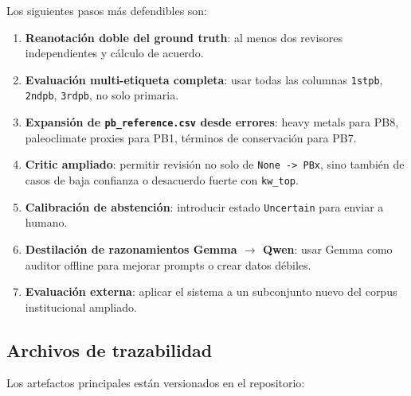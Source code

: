 Los siguientes pasos más defendibles son:

\begin{enumerate}
\item \textbf{Reanotación doble del ground truth}: al menos dos revisores independientes y cálculo de acuerdo.
\item \textbf{Evaluación multi-etiqueta completa}: usar todas las columnas \texttt{1stpb}, \texttt{2ndpb}, \texttt{3rdpb}, no solo primaria.
\item \textbf{Expansión de \texttt{pb\_reference.csv} desde errores}: heavy metals para PB8, paleoclimate proxies para PB1, términos de conservación para PB7.
\item \textbf{Critic ampliado}: permitir revisión no solo de \texttt{None -> PBx}, sino también de casos de baja confianza o desacuerdo fuerte con \texttt{kw\_top}.
\item \textbf{Calibración de abstención}: introducir estado \texttt{Uncertain} para enviar a humano.
\item \textbf{Destilación de razonamientos Gemma $\rightarrow$ Qwen}: usar Gemma como auditor offline para mejorar prompts o crear datos débiles.
\item \textbf{Evaluación externa}: aplicar el sistema a un subconjunto nuevo del corpus institucional ampliado.
\end{enumerate}

\subsection{Archivos de trazabilidad}

Los artefactos principales están versionados en el repositorio:
 

